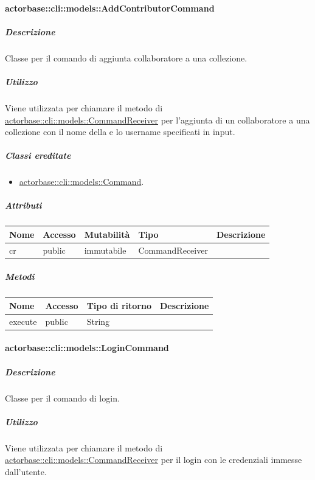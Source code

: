 \documentclass{scalatekids-article}
\begin{document}
\paragraph{actorbase::cli::models::AddContributorCommand}
\label{sec:actorbase::cli::models::AddContributorCommand}

\subparagraph{Descrizione}

Classe per il comando di aggiunta collaboratore a una collezione.

\subparagraph{Utilizzo}

Viene utilizzata per chiamare il metodo di
\hyperref[sec:actorbase::cli::models::CommandReceiver]{actorbase::cli::models::CommandReceiver} per l'aggiunta di un collaboratore a
una collezione con il nome della  e lo username specificati
in input.

\subparagraph{Classi ereditate}

\begin{itemize}
\item \hyperref[sec:actorbase::cli::models::Command]{actorbase::cli::models::Command}.
\end{itemize}

\subparagraph{Attributi}

\begin{tabular}{| l | l | l | l | l |}
	\hline
	Nome & Accesso & Mutabilità & Tipo & Descrizione\\
	\hline
	cr & public & immutabile & CommandReceiver & \\
	\hline
\end{tabular}

\subparagraph{Metodi}

\begin{tabular}{| l | l | l | l |}
	\hline
	Nome & Accesso & Tipo di ritorno & Descrizione\\
	\hline
	execute & public & String & \\
	\hline
\end{tabular}

\paragraph{actorbase::cli::models::LoginCommand}
\label{sec:actorbase::cli::models::LoginCommand}

\subparagraph{Descrizione}

Classe per il comando di login.

\subparagraph{Utilizzo}

Viene utilizzata per chiamare il metodo di
\hyperref[sec:actorbase::cli::models::CommandReceiver]{actorbase::cli::models::CommandReceiver} per il login con le credenziali
immesse dall'utente.
\end{document}
